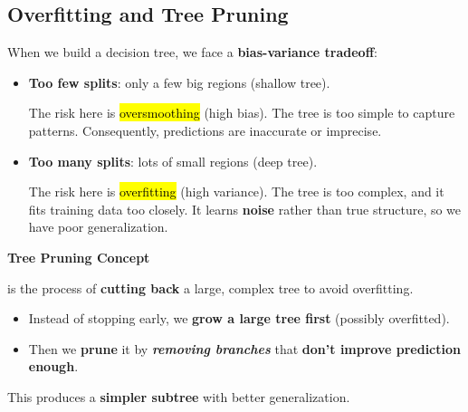 \subsection{Overfitting and Tree Pruning}

When we build a decision tree, we face a \textbf{bias-variance tradeoff}:
\begin{itemize}
    \item \textbf{Too few splits}: only a few big regions (shallow tree).
    
    The risk here is \hl{oversmoothing} (high bias). The tree is too simple to capture patterns. Consequently, predictions are inaccurate or imprecise.


    \item \textbf{Too many splits}: lots of small regions (deep tree).
    
    The risk here is \hl{overfitting} (high variance). The tree is too complex, and it fits training data too closely. It learns \textbf{noise} rather than true structure, so we have poor generalization.
\end{itemize}

\highspace
\begin{flushleft}
    \textcolor{Green3}{ \textbf{Tree Pruning Concept}}
\end{flushleft}
 is the process of \textbf{cutting back} a large, complex tree to avoid overfitting.
\begin{itemize}
    \item Instead of stopping early, we \textbf{grow a large tree first} (possibly overfitted).
    \item Then we \textbf{prune} it by \textbf{\emph{removing branches}} that \textbf{don't improve prediction enough}.
\end{itemize}
This produces a \textbf{simpler subtree} with better generalization.

